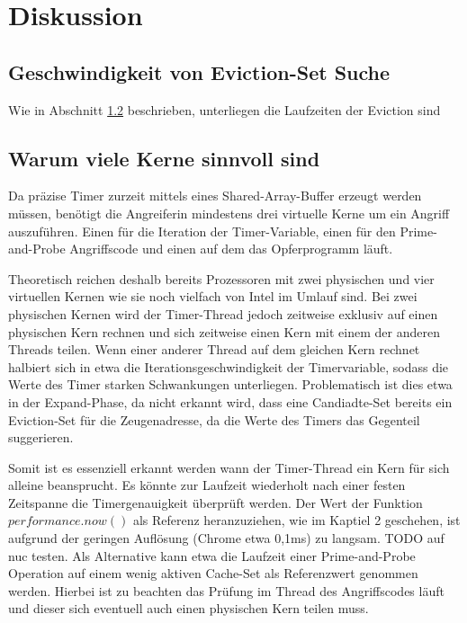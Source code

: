 \chapter{Diskussion}
\label{chapter:discussion}



\section{Geschwindigkeit von Eviction-Set Suche}
Wie in Abschnitt \ref{} beschrieben, unterliegen die Laufzeiten der Eviction sind


\section{Warum viele Kerne sinnvoll sind}
Da präzise Timer zurzeit mittels eines Shared-Array-Buffer erzeugt werden müssen, benötigt die Angreiferin mindestens drei virtuelle Kerne um ein Angriff auszuführen. Einen für die Iteration der Timer-Variable, einen für den Prime-and-Probe Angriffscode und einen auf dem das Opferprogramm läuft.

Theoretisch reichen deshalb bereits Prozessoren mit zwei physischen und vier virtuellen Kernen wie sie noch vielfach von Intel im Umlauf sind. Bei zwei physischen Kernen wird der Timer-Thread jedoch zeitweise exklusiv auf einen physischen Kern rechnen und sich zeitweise einen Kern mit einem der anderen Threads teilen.
Wenn einer anderer Thread auf dem gleichen Kern rechnet halbiert sich in etwa die Iterationsgeschwindigkeit der Timervariable, sodass die Werte des Timer starken Schwankungen unterliegen.
Problematisch ist dies etwa in der Expand-Phase, da nicht erkannt wird, dass eine Candiadte-Set bereits ein Eviction-Set für die Zeugenadresse, da die Werte des Timers das Gegenteil suggerieren.

Somit ist es essenziell erkannt werden wann der Timer-Thread ein Kern für sich alleine beansprucht.
Es könnte zur Laufzeit wiederholt nach einer festen Zeitspanne die Timergenauigkeit überprüft werden.
Der Wert der Funktion $performance.now()$ als Referenz heranzuziehen, wie im Kaptiel 2 geschehen, ist aufgrund der geringen Auflösung (Chrome etwa 0,1ms) zu langsam.
TODO auf nuc testen.
Als Alternative kann etwa die Laufzeit einer Prime-and-Probe Operation auf einem wenig aktiven Cache-Set als Referenzwert genommen werden.
Hierbei ist zu beachten das Prüfung im Thread des Angriffscodes läuft und dieser sich eventuell auch einen physischen Kern teilen muss.

